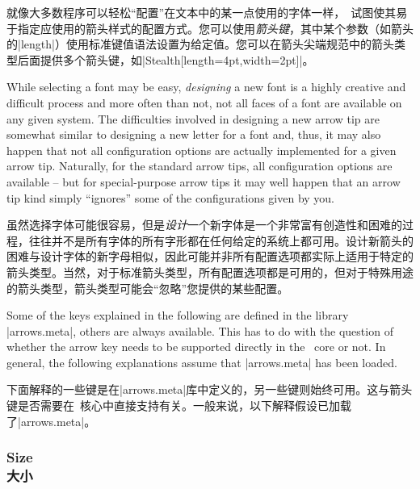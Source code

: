 就像大多数程序可以轻松“配置”在文本中的某一点使用的字体一样，\tikzname\ 试图使其易于指定应使用的箭头样式的配置方式。您可以使用\emph{箭头键}，其中某个参数（如箭头的|length|）使用标准键值语法设置为给定值。您可以在箭头尖端规范中的箭头类型后面提供多个箭头键，如|Stealth[length=4pt,width=2pt]|。

While selecting a font may be easy, \emph{designing} a new font is a highly
creative and difficult process and more often than not, not all faces of a font
are available on any given system. The difficulties involved in designing a new
arrow tip are somewhat similar to designing a new letter for a font and, thus,
it may also happen that not all configuration options are actually implemented
for a given arrow tip. Naturally, for the standard arrow tips, all
configuration options are available -- but for special-purpose arrow tips it
may well happen that an arrow tip kind simply ``ignores'' some of the
configurations given by you.


虽然选择字体可能很容易，但是\emph{设计}一个新字体是一个非常富有创造性和困难的过程，往往并不是所有字体的所有字形都在任何给定的系统上都可用。设计新箭头的困难与设计字体的新字母相似，因此可能并非所有配置选项都实际上适用于特定的箭头类型。当然，对于标准箭头类型，所有配置选项都是可用的，但对于特殊用途的箭头类型，箭头类型可能会“忽略”您提供的某些配置。

Some of the keys explained in the following are defined in the library
|arrows.meta|, others are always available. This has to do with the question of
whether the arrow key needs to be supported directly in the \pgfname\ core or
not. In general, the following explanations assume that |arrows.meta| has been
loaded.

下面解释的一些键是在|arrows.meta|库中定义的，另一些键则始终可用。这与箭头键是否需要在\pgfname\ 核心中直接支持有关。一般来说，以下解释假设已加载了|arrows.meta|。



\subsubsection{Size\\大小}

